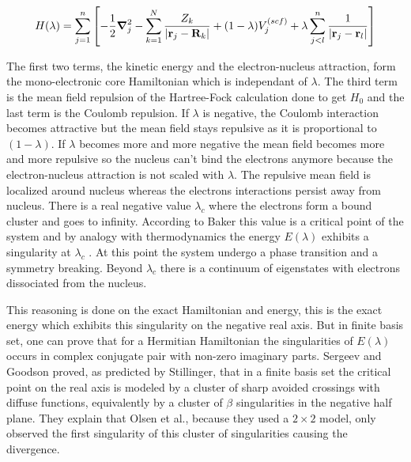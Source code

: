 \documentclass[11pt,a4paper]{article}
\begin{document}
{\begin{equation}
    H(\lambda)=\sum\limits_{j=1}^{n}\left[-\frac{1}{2}\grad_j^2 - \sum\limits_{k=1}^{N} \frac{Z_k}{|\vb{r}_j-\vb{R}_k|} + (1-\lambda)V_j^{(scf)}+\lambda\sum\limits_{j<l}^{n}\frac{1}{|\vb{r}_j-\vb{r}_l|} \right]
\end{equation}

The first two terms, the kinetic energy and the electron-nucleus attraction, form the mono-electronic core Hamiltonian which is independant of $\lambda$. The third term is the mean field repulsion of the Hartree-Fock calculation done to get $H_0$ and the last term is the Coulomb repulsion. If $\lambda$ is negative, the Coulomb interaction becomes attractive but the mean field stays repulsive as it is proportional to $(1-\lambda)$. If $\lambda$ becomes more and more negative the mean field becomes more and more repulsive so the nucleus can't bind the electrons anymore because the electron-nucleus attraction is not scaled with $\lambda$. The repulsive mean field is localized around nucleus whereas the electrons interactions persist away from nucleus. There is a real negative value $\lambda_c$ where the electrons form a bound cluster and goes to infinity. According to Baker this value is a critical point of the system and by analogy with thermodynamics the energy $E(\lambda)$ exhibits a singularity at $\lambda_c$ \cite{Baker_1971}. At this point the system undergo a phase transition and a symmetry breaking. Beyond $\lambda_c$ there is a continuum of eigenstates with electrons dissociated from the nucleus.

This reasoning is done on the exact Hamiltonian and energy, this is the exact energy which exhibits this singularity on the negative real axis. But in finite basis set, one can prove that for a Hermitian Hamiltonian the singularities of $E(\lambda)$ occurs in complex conjugate pair with non-zero imaginary parts. Sergeev and Goodson proved, as predicted by Stillinger, that in a finite basis set the critical point on the real axis is modeled by a cluster of sharp avoided crossings with diffuse functions, equivalently by a cluster of $\beta$ singularities in the negative half plane. They explain that Olsen et al., because they used a $2\times2$ model, only observed the first singularity of this cluster of singularities causing the divergence.

}
\end{document}
